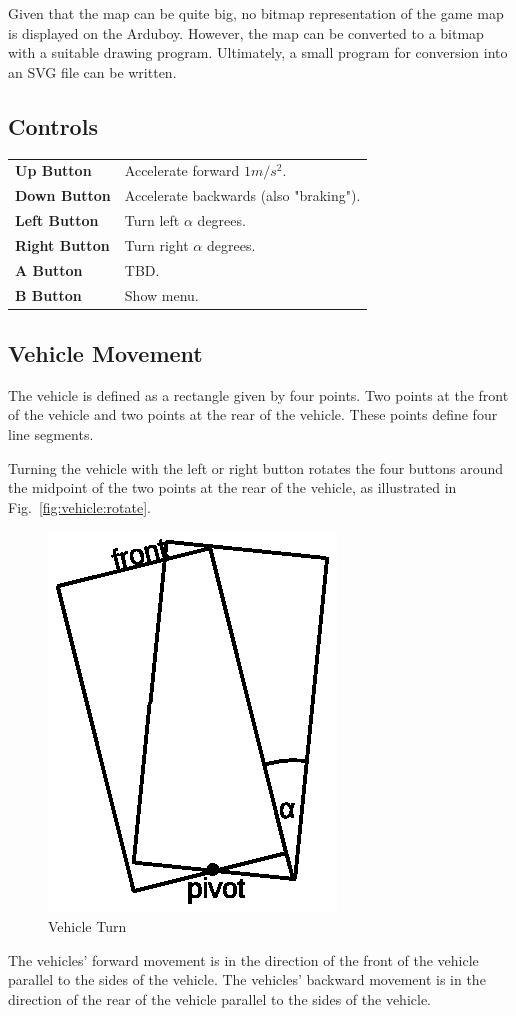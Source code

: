 \documentclass[11pt]{article}
\newcommand{\figref}[1]{Fig.~\eqref{#1}}
\begin{document}
Given that the map can be quite big, no bitmap representation of the game map
is displayed on the Arduboy. However, the map can be converted to a bitmap 
with a suitable drawing program. Ultimately, a small program for conversion
into an SVG file can be written.

\subsection{Controls}
\label{sec:controls}

\begin{tabular}{>{\sffamily\bfseries}ll}
    Up Button & Accelerate forward $1m/s^2$. \\
    Down Button & Accelerate backwards (also "braking").\\
    Left Button & Turn left $\alpha$ degrees.\\
    Right Button & Turn right $\alpha$ degrees.\\
    A Button & TBD.\\
    B Button & Show menu.\\
\end{tabular}

\subsection{Vehicle Movement}
\label{sec:vehicle:movement}

The vehicle is defined as a rectangle given by four points. Two points at the
front of the vehicle and two points at the rear of the vehicle. These points 
define four line segments. 

Turning the vehicle with the left or right button rotates the four buttons 
around the midpoint of the two points at the rear of the vehicle, as
illustrated in \figref{fig:vehicle:rotate}.
\begin{figure}
    \centering
    \includegraphics{vehicle-turn.eps}
    \caption{Vehicle Turn}\label{fig:vehicle:rotate}
\end{figure}
The vehicles' forward movement is in the direction of the front of the vehicle
parallel to the sides of the vehicle. 
The vehicles' backward movement is in the direction of the rear of the vehicle
parallel to the sides of the vehicle. 
\end{document}
